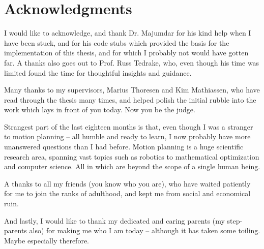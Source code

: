 \chapter{Acknowledgments}

I would like to acknowledge, and thank Dr. Majumdar for his kind help when I
have been stuck, and for his code stubs which provided the basis for the
implementation of this thesis, and for which I probably not would have gotten
far. A thanks also goes out to Prof. Russ Tedrake, who, even though his time was
limited found the time for thoughtful insights and guidance.

Many thanks to my supervisors, Marius Thoresen and Kim Mathiassen, who have read
through the thesis many times, and helped polish the initial rubble into the
work which lays in front of you today. Now you be the judge.

Strangest part of the last eighteen months is that, even though I was a stranger
to motion planning -- all humble and ready to learn, I now probably have more
unanswered questions than I had before. Motion planning is a huge scientific
research area, spanning vast topics such as robotics to mathematical optimization
and computer science. All in which are beyond the scope of a single human being.

A thanks to all my friends (you know who you are), who have waited patiently for
me to join the ranks of adulthood, and kept me from social and economical ruin.

And lastly, I would like to thank my dedicated and caring parents (my
step-parents also) for making me who I am today -- although it has taken some
toiling. Maybe especially therefore.
